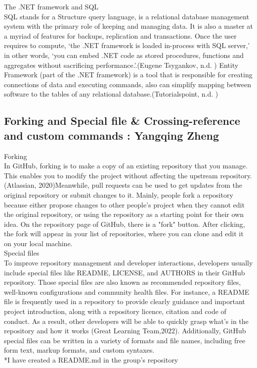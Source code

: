 \documentclass[a4paper, 11pt]{report}
\begin{document}
\noindent The .NET framework and SQL\\
\noindent SQL stands for a Structure query language, is a relational database management system with the primary role of keeping and managing data. It is also a master at a myriad of features for backups, replication and transactions. Once the user requires to compute, ‘the .NET framework is loaded in-process with SQL server,’ in other words, ‘you can embed .NET code as stored procedures, functions and aggregates without sacrificing performance.’.(Eugene Tsygankov, n.d. ) Entity Framework (part of the .NET framework) is a tool that is responsible for creating connections of data and executing commands,  also can simplify mapping between software to the tables of any relational database.(Tutorialspoint, n.d. )
\\


\subsection{Forking and Special file \& Crossing-reference and custom commands : Yangqing Zheng}

\noindent Forking\\
\noindent In GitHub, forking is to make a copy of an existing repository that you manage. This enables you to modify the project without affecting the upstream repository.  (Atlassian, 2020)Meanwhile, pull requests can be used to get updates from the original repository or submit changes to it. Mainly, people fork a repository because either propose changes to other people’s project when they cannot edit the original repository, or using the repository as a starting point for their own idea. On the repository page of GitHub, there is a "fork" button. After clicking, the fork will appear in your list of repositories, where you can clone and edit it on your local machine. \\

\noindent Special files\\
\noindent To improve repository management and developer interactions, developers usually  include special files like README, LICENSE, and AUTHORS in their GitHub repository. Those special files are also known as recommended repository files, well-known configurations and community health files. For instance, a README file is frequently used in a repository to provide clearly guidance and important project introduction, along with a repository licence, citation and code of conduct. As a result, other developers will be able to quickly grasp what's in the repository and how it works (Great Learning Team,2022).  Additionally, GitHub special files can be written in a variety of formats and file names, including free form text, markup formats, and custom syntaxes.\\
*I have created a README.md in the group's repository\\
\end{document}
